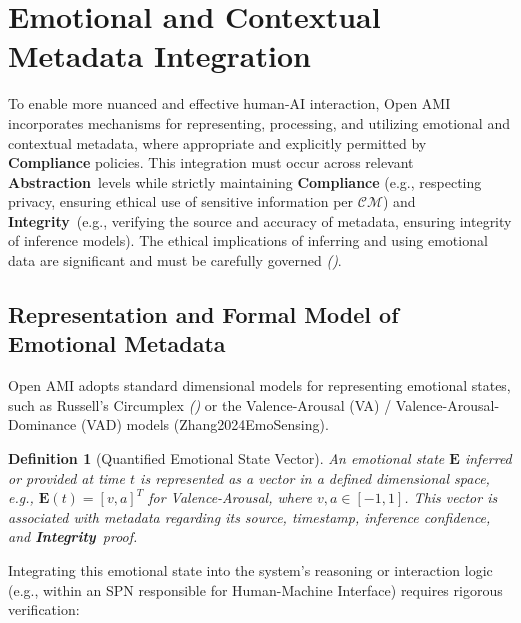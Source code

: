 \documentclass[12pt,a4paper]{report}
\renewcommand{\citep}[1]{\textit{\scriptsize{(\cite{#1})}}}
\newtheorem{definition}{Definition}[section]
\newcommand{\Integrity}{\textbf{Integrity}}
\newcommand{\Abstraction}{\textbf{Abstraction}}
\begin{document}
	\section{Emotional and Contextual Metadata Integration}
	\label{sec:2-8}
	
	To enable more nuanced and effective human-AI interaction, Open AMI incorporates mechanisms for representing, processing, and utilizing emotional and contextual metadata, where appropriate and explicitly permitted by \textbf{Compliance} policies. This integration must occur across relevant \Abstraction\ levels while strictly maintaining \textbf{Compliance} (e.g., respecting privacy, ensuring ethical use of sensitive information per $\mathcal{CM}$) and \Integrity\ (e.g., verifying the source and accuracy of metadata, ensuring integrity of inference models). The ethical implications of inferring and using emotional data are significant and must be carefully governed \citep{Sekrst2024Guardrails}.
	
	\subsection{Representation and Formal Model of Emotional Metadata}
	\label{sec:2-8-1}
	
	Open AMI adopts standard dimensional models for representing emotional states, such as Russell's Circumplex \citep{Russell1980Circumplex} or the Valence-Arousal (VA) / Valence-Arousal-Dominance (VAD) models (Zhang2024EmoSensing).
	
	\begin{definition}[Quantified Emotional State Vector]
		\label{def:emo_vector}
		An emotional state $\mathbf{E}$ inferred or provided at time $t$ is represented as a vector in a defined dimensional space, e.g., $\mathbf{E}(t) = [v, a]^T$ for Valence-Arousal, where $v, a \in [-1, 1]$. This vector is associated with metadata regarding its source, timestamp, inference confidence, and \Integrity\ proof.
	\end{definition}
	
	Integrating this emotional state into the system's reasoning or interaction logic (e.g., within an SPN responsible for Human-Machine Interface) requires rigorous verification:
	
\end{document}

